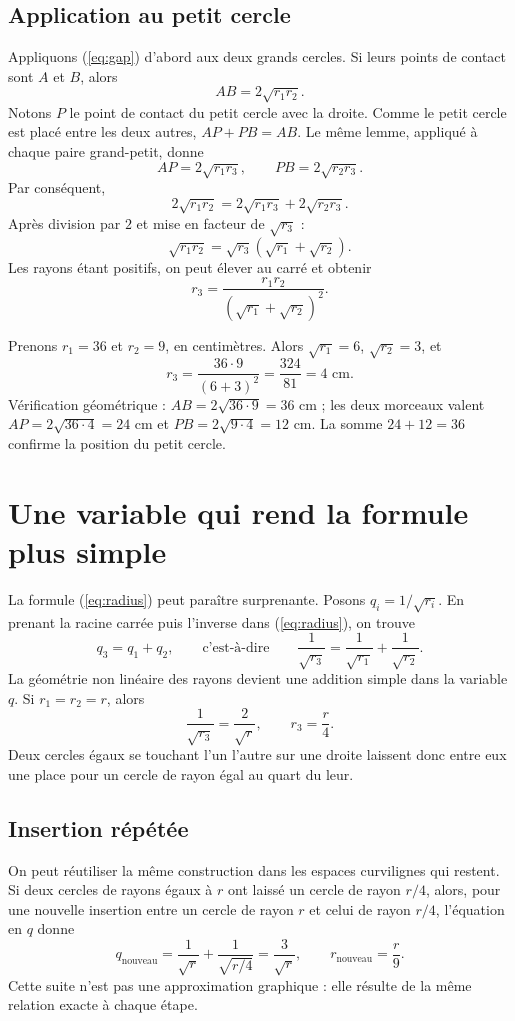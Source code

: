 \subsection{Application au petit cercle}
Appliquons (\ref{eq:gap}) d'abord aux deux grands cercles. Si leurs points de contact sont $A$ et $B$, alors
\[
 AB=2\sqrt{r_1r_2}.
\]
Notons $P$ le point de contact du petit cercle avec la droite. Comme le petit cercle est placé entre les deux autres, $AP+PB=AB$. Le même lemme, appliqué à chaque paire grand-petit, donne
\[
 AP=2\sqrt{r_1r_3},\qquad PB=2\sqrt{r_2r_3}.
\]
Par conséquent,
\[
 2\sqrt{r_1r_2}=2\sqrt{r_1r_3}+2\sqrt{r_2r_3}.
\]
Après division par $2$ et mise en facteur de $\sqrt{r_3}$ :
\[
 \sqrt{r_1r_2}=\sqrt{r_3}(\sqrt{r_1}+\sqrt{r_2}).
\]
Les rayons étant positifs, on peut élever au carré et obtenir
\begin{equation}\label{eq:radius}
 \boxed{r_3=\frac{r_1r_2}{(\sqrt{r_1}+\sqrt{r_2})^2}}.
\end{equation}

\begin{exemple}
Prenons $r_1=36$ et $r_2=9$, en centimètres. Alors $\sqrt{r_1}=6$, $\sqrt{r_2}=3$, et
\[
 r_3=\frac{36\cdot9}{(6+3)^2}=\frac{324}{81}=4\text{ cm}.
\]
Vérification géométrique : $AB=2\sqrt{36\cdot9}=36$ cm ; les deux morceaux valent $AP=2\sqrt{36\cdot4}=24$ cm et $PB=2\sqrt{9\cdot4}=12$ cm. La somme $24+12=36$ confirme la position du petit cercle.
\end{exemple}

\section{Une variable qui rend la formule plus simple}
La formule (\ref{eq:radius}) peut paraître surprenante. Posons $q_i=1/\sqrt{r_i}$. En prenant la racine carrée puis l'inverse dans (\ref{eq:radius}), on trouve
\begin{equation}\label{eq:q}
 \boxed{q_3=q_1+q_2},\qquad\text{c'est-à-dire}\qquad
 \frac{1}{\sqrt{r_3}}=\frac{1}{\sqrt{r_1}}+\frac{1}{\sqrt{r_2}}.
\end{equation}
La géométrie non linéaire des rayons devient une addition simple dans la variable $q$. Si $r_1=r_2=r$, alors
\[
 \frac{1}{\sqrt{r_3}}=\frac{2}{\sqrt r},\qquad r_3=\frac r4.
\]
Deux cercles égaux se touchant l'un l'autre sur une droite laissent donc entre eux une place pour un cercle de rayon égal au quart du leur.

\subsection{Insertion répétée}
On peut réutiliser la même construction dans les espaces curvilignes qui restent. Si deux cercles de rayons égaux à $r$ ont laissé un cercle de rayon $r/4$, alors, pour une nouvelle insertion entre un cercle de rayon $r$ et celui de rayon $r/4$, l'équation en $q$ donne
\[
 q_{\mathrm{nouveau}}=\frac1{\sqrt r}+\frac1{\sqrt{r/4}}=\frac3{\sqrt r},
 \qquad r_{\mathrm{nouveau}}=\frac r9.
\]
Cette suite n'est pas une approximation graphique : elle résulte de la même relation exacte à chaque étape.

